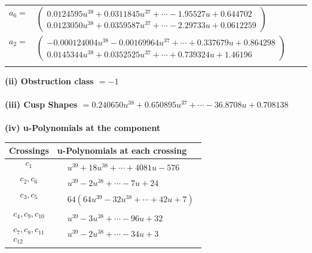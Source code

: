 \documentclass[1p]{elsarticle_modified}
\theoremstyle{definition}
\begin{document}
\begin{tabular}{m{7pt} m{180pt} m{7pt} m{180pt} }
\flushright $a_{6}=$&$\begin{pmatrix}0.0124595 u^{38}+0.0311845 u^{37}+\cdots-1.95527 u+0.644702\\0.0123050 u^{38}+0.0359587 u^{37}+\cdots-2.29733 u+0.0612259\end{pmatrix}$ \\
\flushright $a_{2}=$&$\begin{pmatrix}-0.000124004 u^{38}-0.00169964 u^{37}+\cdots+0.337679 u+0.864298\\0.0145344 u^{38}+0.0352525 u^{37}+\cdots+0.739324 u+1.46196\end{pmatrix}$\\&\end{tabular}
\flushleft \textbf{(ii) Obstruction class $= -1$}\\~\\
\flushleft \textbf{(iii) Cusp Shapes $= 0.240650 u^{38}+0.650895 u^{37}+\cdots-36.8708 u+0.708138$}\\~\\
\newpage\renewcommand{\arraystretch}{1}
\flushleft \textbf{(iv) u-Polynomials at the component}\newline \\
\begin{tabular}{m{50pt}|m{274pt}}
Crossings & \hspace{64pt}u-Polynomials at each crossing \\
\hline $$\begin{aligned}c_{1}\end{aligned}$$&$\begin{aligned}
&u^{39}+18 u^{38}+\cdots+4081 u-576
\end{aligned}$\\
\hline $$\begin{aligned}c_{2},c_{6}\end{aligned}$$&$\begin{aligned}
&u^{39}-2 u^{38}+\cdots-7 u+24
\end{aligned}$\\
\hline $$\begin{aligned}c_{3},c_{5}\end{aligned}$$&$\begin{aligned}
&64(64 u^{39}-32 u^{38}+\cdots+42 u+7)
\end{aligned}$\\
\hline $$\begin{aligned}c_{4},c_{9},c_{10}\end{aligned}$$&$\begin{aligned}
&u^{39}-3 u^{38}+\cdots-96 u+32
\end{aligned}$\\
\hline $$\begin{aligned}c_{7},c_{8},c_{11}\\c_{12}\end{aligned}$$&$\begin{aligned}
&u^{39}-2 u^{38}+\cdots-34 u+3
\end{aligned}$\\
\hline
\end{tabular}\\~\\
\end{document}
